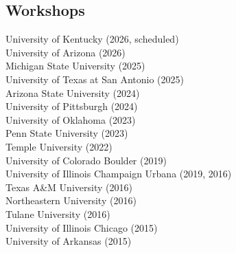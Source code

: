 \documentclass[]{deedy-resume-openfont}
\begin{document}
\begin{minipage}[t]{0.49\textwidth} 

\subsection{Workshops}
University of Kentucky (2026, scheduled) \\
University of Arizona (2026) \\
Michigan State University (2025) \\
University of Texas at San Antonio (2025) \\
Arizona State University (2024) \\ 
University of Pittsburgh (2024) \\
University of Oklahoma (2023) \\
Penn State University (2023) \\
Temple University (2022) \\
University of Colorado Boulder (2019) \\
University of Illinois Champaign Urbana (2019, 2016) \\
Texas A\&M University (2016) \\
Northeastern University (2016) \\
Tulane University (2016) \\
University of Illinois Chicago (2015) \\
University of Arkansas (2015) \\

\end{minipage}


\end{document}
